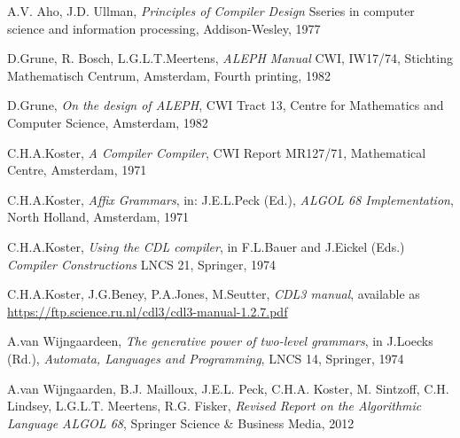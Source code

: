 \documentclass[titlepage]{article}
\begin{document}
\begin{thebibliography}{99}
A.V. Aho, J.D. Ullman,
\emph{Principles of Compiler Design}
Sseries in computer science and information processing,
Addison-Wesley, 1977

D.Grune, R. Bosch, L.G.L.T.Meertens,
\emph{ALEPH Manual}
CWI, IW17/74, Stichting Mathematisch Centrum, Amsterdam, 
Fourth printing, 1982

D.Grune,
\emph{On the design of ALEPH},
CWI Tract 13, Centre for Mathematics and Computer Science, Amsterdam, 1982

C.H.A.Koster,
\emph{A Compiler Compiler},
CWI Report MR127/71,
Mathematical Centre, Amsterdam, 1971

C.H.A.Koster,
\emph{Affix Grammars}, in:
J.E.L.Peck (Ed.), \emph{ALGOL 68 Implementation}, North Holland, Amsterdam,
1971

C.H.A.Koster,
\emph{Using the CDL compiler}, in
F.L.Bauer and J.Eickel (Eds.) \emph{Compiler Constructions}
LNCS 21, Springer, 1974

C.H.A.Koster, J.G.Beney, P.A.Jones, M.Seutter,
\emph{CDL3 manual},
available as \url{https://ftp.science.ru.nl/cdl3/cdl3-manual-1.2.7.pdf}

A.van Wijngaardeen,
\emph{The generative power of two-level grammars}, in
J.Loecks (Rd.), \emph{Automata, Languages and Programming},
LNCS 14, Springer, 1974

A.van Wijngaarden, B.J. Mailloux, J.E.L. Peck,
C.H.A.  Koster, M. Sintzoff, C.H. Lindsey, L.G.L.T. Meertens, R.G. Fisker,
\emph{Revised Report on the Algorithmic Language ALGOL 68},
Springer Science \& Business Media, 2012

\end{thebibliography}
\end{document}
